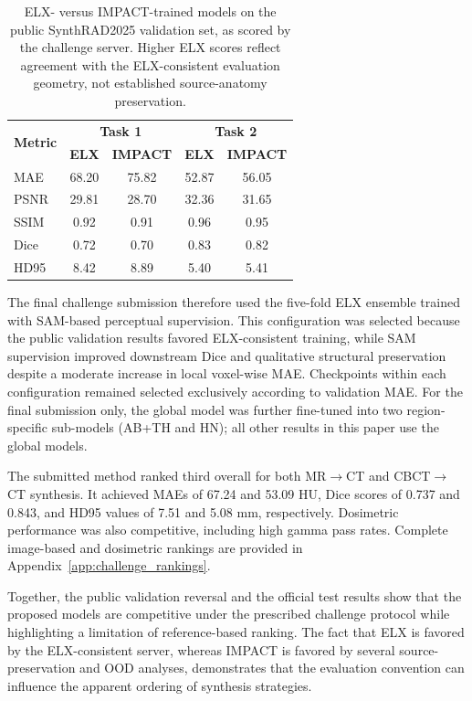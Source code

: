 \documentclass[lettersize,journal]{IEEEtran}
\begin{document}
\begin{table}[h!]
\centering
\footnotesize
\caption{ELX- versus IMPACT-trained models on the public SynthRAD2025 validation set, as scored by the challenge server. Higher ELX scores reflect agreement with the ELX-consistent evaluation geometry, not established source-anatomy preservation.}
\label{tab:public_split}
\begin{tabular}{lcc|cc}
\toprule
\multirow{2}{*}{\textbf{Metric}} & \multicolumn{2}{c|}{\textbf{Task 1}} & \multicolumn{2}{c}{\textbf{Task 2}} \\
 & \textbf{ELX} & \textbf{IMPACT} & \textbf{ELX} & \textbf{IMPACT} \\
\midrule
MAE  & 68.20 & 75.82 &       52.87 & 56.05 \\
PSNR & 29.81 & 28.70 &  32.36 & 31.65 \\
SSIM & 0.92 & 0.91 &        0.96 & 0.95 \\
Dice & 0.72 & 0.70 &        0.83 & 0.82 \\
HD95 & 8.42 & 8.89 &         5.40 & 5.41 \\
\bottomrule
\end{tabular}

\end{table}

The final challenge submission therefore used the five-fold ELX ensemble trained with SAM-based perceptual supervision. This
configuration was selected because the public validation results favored ELX-consistent training, while SAM supervision improved
downstream Dice and qualitative structural preservation despite a moderate increase in local voxel-wise MAE. Checkpoints within each configuration remained selected exclusively according to validation MAE. For the final submission only, the global model was further fine-tuned into two region-specific sub-models (AB+TH and HN); all other results in this paper use the global models.

The submitted method ranked third overall for both MR$\rightarrow$CT and CBCT$\rightarrow$CT synthesis. It achieved MAEs of 67.24 and 53.09 HU, Dice scores of 0.737 and 0.843, and HD95 values of 7.51 and 5.08 mm, respectively. Dosimetric performance was also competitive, including high gamma pass rates. Complete image-based and dosimetric rankings are provided in Appendix~\ref{app:challenge_rankings}.

Together, the public validation reversal and the official test results show that the proposed models are competitive under the prescribed challenge protocol while highlighting a limitation of reference-based ranking. The fact that ELX is favored by the ELX-consistent server, whereas IMPACT is favored by several source-preservation and OOD analyses, demonstrates that the evaluation convention can influence the apparent ordering of synthesis strategies.
\end{document}
